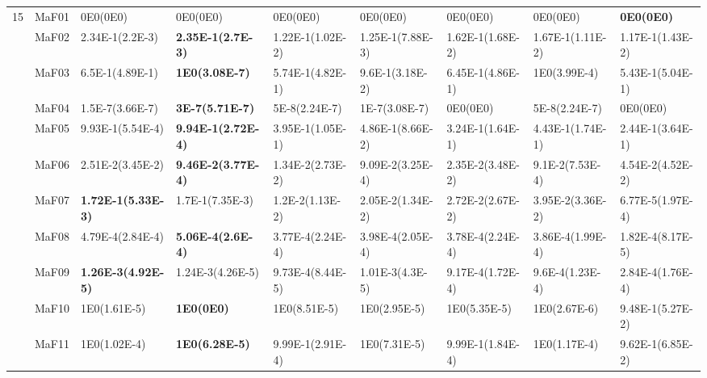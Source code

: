 \documentclass[]{article}
\begin{document}
\begin{landscape}
\begin{table}
\begin{footnotesize}
\begin{tabular}{|l|l|l|l|l|l|l|l|l|}
\multirow{15}{*}{15} & MaF01 & \cellcolor{gray95} 0E0(0E0) & \cellcolor{gray95} 0E0(0E0) & \cellcolor{gray95} 0E0(0E0) & \cellcolor{gray95} 0E0(0E0) & \cellcolor{gray95} 0E0(0E0) & \cellcolor{gray95} 0E0(0E0) & \cellcolor{gray95} {\bf 0E0(0E0)}\\
 & MaF02 & \cellcolor{gray95} 2.34E-1(2.2E-3) & \cellcolor{gray95} {\bf 2.35E-1(2.7E-3)} & 1.22E-1(1.02E-2) & 1.25E-1(7.88E-3) & 1.62E-1(1.68E-2) & 1.67E-1(1.11E-2) & 1.17E-1(1.43E-2)\\
 & MaF03 & 6.5E-1(4.89E-1) & \cellcolor{gray95} {\bf 1E0(3.08E-7)} & 5.74E-1(4.82E-1) & 9.6E-1(3.18E-2) & 6.45E-1(4.86E-1) & 1E0(3.99E-4) & 5.43E-1(5.04E-1)\\
 & MaF04 & \cellcolor{gray95} 1.5E-7(3.66E-7) & \cellcolor{gray95} {\bf 3E-7(5.71E-7)} & \cellcolor{gray95} 5E-8(2.24E-7) & \cellcolor{gray95} 1E-7(3.08E-7) & \cellcolor{gray95} 0E0(0E0) & \cellcolor{gray95} 5E-8(2.24E-7) & \cellcolor{gray95} 0E0(0E0)\\
 & MaF05 & \cellcolor{gray95} 9.93E-1(5.54E-4) & \cellcolor{gray95} {\bf 9.94E-1(2.72E-4)} & 3.95E-1(1.05E-1) & 4.86E-1(8.66E-2) & 3.24E-1(1.64E-1) & 4.43E-1(1.74E-1) & 2.44E-1(3.64E-1)\\
 & MaF06 & 2.51E-2(3.45E-2) & \cellcolor{gray95} {\bf 9.46E-2(3.77E-4)} & 1.34E-2(2.73E-2) & \cellcolor{gray95} 9.09E-2(3.25E-4) & 2.35E-2(3.48E-2) & \cellcolor{gray95} 9.1E-2(7.53E-4) & 4.54E-2(4.52E-2)\\
 & MaF07 & \cellcolor{gray95} {\bf 1.72E-1(5.33E-3)} & \cellcolor{gray95} 1.7E-1(7.35E-3) & 1.2E-2(1.13E-2) & 2.05E-2(1.34E-2) & 2.72E-2(2.67E-2) & 3.95E-2(3.36E-2) & 6.77E-5(1.97E-4)\\
 & MaF08 & \cellcolor{gray95} 4.79E-4(2.84E-4) & \cellcolor{gray95} {\bf 5.06E-4(2.6E-4)} & \cellcolor{gray95} 3.77E-4(2.24E-4) & \cellcolor{gray95} 3.98E-4(2.05E-4) & \cellcolor{gray95} 3.78E-4(2.24E-4) & 3.86E-4(1.99E-4) & 1.82E-4(8.17E-5)\\
 & MaF09 & \cellcolor{gray95} {\bf 1.26E-3(4.92E-5)} & \cellcolor{gray95} 1.24E-3(4.26E-5) & 9.73E-4(8.44E-5) & 1.01E-3(4.3E-5) & 9.17E-4(1.72E-4) & 9.6E-4(1.23E-4) & 2.84E-4(1.76E-4)\\
 & MaF10 & \cellcolor{gray95} 1E0(1.61E-5) & \cellcolor{gray95} {\bf 1E0(0E0)} & 1E0(8.51E-5) & 1E0(2.95E-5) & 1E0(5.35E-5) & \cellcolor{gray95} 1E0(2.67E-6) & 9.48E-1(5.27E-2)\\
 & MaF11 & \cellcolor{gray95} 1E0(1.02E-4) & \cellcolor{gray95} {\bf 1E0(6.28E-5)} & 9.99E-1(2.91E-4) & \cellcolor{gray95} 1E0(7.31E-5) & 9.99E-1(1.84E-4) & 1E0(1.17E-4) & 9.62E-1(6.85E-2)\\

\end{tabular}
\end{footnotesize}
\end{table}
\end{landscape}
\end{document}
